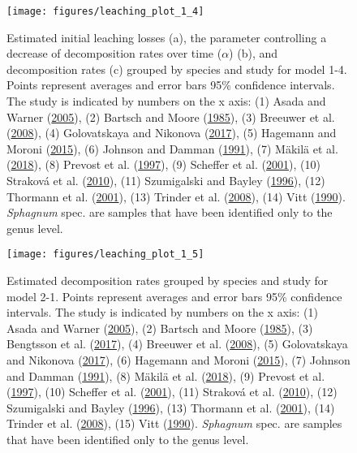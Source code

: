 \documentclass[
  12pt,
]{article}
\begin{document}
\begin{figure}[H]

{\centering \texttt{[image: figures/leaching\_plot\_1\_4]} 

}

\caption{Estimated initial leaching losses (a), the parameter controlling a decrease of decomposition rates over time (\(\alpha\)) (b), and decomposition rates (c) grouped by species and study for model 1-4. Points represent averages and error bars 95\% confidence intervals. The study is indicated by numbers on the x axis: (1) Asada and Warner (\protect\hyperlink{ref-Asada.2005b}{2005}), (2) Bartsch and Moore (\protect\hyperlink{ref-Bartsch.1985}{1985}), (3) Breeuwer et al. (\protect\hyperlink{ref-Breeuwer.2008}{2008}), (4) Golovatskaya and Nikonova (\protect\hyperlink{ref-Golovatskaya.2017}{2017}), (5) Hagemann and Moroni (\protect\hyperlink{ref-Hagemann.2015}{2015}), (6) Johnson and Damman (\protect\hyperlink{ref-Johnson.1991}{1991}), (7) Mäkilä et al. (\protect\hyperlink{ref-Makila.2018}{2018}), (8) Prevost et al. (\protect\hyperlink{ref-Prevost.1997}{1997}), (9) Scheffer et al. (\protect\hyperlink{ref-Scheffer.2001}{2001}), (10) Straková et al. (\protect\hyperlink{ref-Strakova.2010}{2010}), (11) Szumigalski and Bayley (\protect\hyperlink{ref-Szumigalski.1996}{1996}), (12) Thormann et al. (\protect\hyperlink{ref-Thormann.2001}{2001}), (13) Trinder et al. (\protect\hyperlink{ref-Trinder.2008}{2008}), (14) Vitt (\protect\hyperlink{ref-Vitt.1990}{1990}). \emph{Sphagnum} spec. are samples that have been identified only to the genus level.}\label{fig:sup-out-mm-p5-1-4}
\end{figure}
\begin{figure}[H]

{\centering \texttt{[image: figures/leaching\_plot\_1\_5]} 

}

\caption{Estimated decomposition rates grouped by species and study for model 2-1. Points represent averages and error bars 95\% confidence intervals. The study is indicated by numbers on the x axis: (1) Asada and Warner (\protect\hyperlink{ref-Asada.2005b}{2005}), (2) Bartsch and Moore (\protect\hyperlink{ref-Bartsch.1985}{1985}), (3) Bengtsson et al. (\protect\hyperlink{ref-Bengtsson.2017}{2017}), (4) Breeuwer et al. (\protect\hyperlink{ref-Breeuwer.2008}{2008}), (5) Golovatskaya and Nikonova (\protect\hyperlink{ref-Golovatskaya.2017}{2017}), (6) Hagemann and Moroni (\protect\hyperlink{ref-Hagemann.2015}{2015}), (7) Johnson and Damman (\protect\hyperlink{ref-Johnson.1991}{1991}), (8) Mäkilä et al. (\protect\hyperlink{ref-Makila.2018}{2018}), (9) Prevost et al. (\protect\hyperlink{ref-Prevost.1997}{1997}), (10) Scheffer et al. (\protect\hyperlink{ref-Scheffer.2001}{2001}), (11) Straková et al. (\protect\hyperlink{ref-Strakova.2010}{2010}), (12) Szumigalski and Bayley (\protect\hyperlink{ref-Szumigalski.1996}{1996}), (13) Thormann et al. (\protect\hyperlink{ref-Thormann.2001}{2001}), (14) Trinder et al. (\protect\hyperlink{ref-Trinder.2008}{2008}), (15) Vitt (\protect\hyperlink{ref-Vitt.1990}{1990}). \emph{Sphagnum} spec. are samples that have been identified only to the genus level.}\label{fig:sup-out-mm-p5-1-5}
\end{figure}
\end{document}
